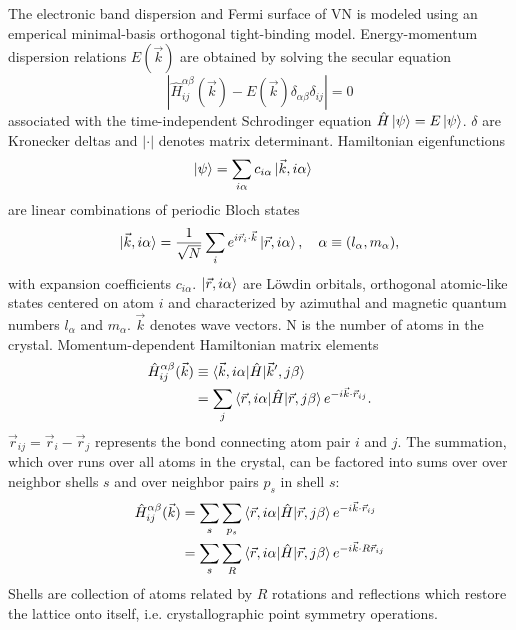 \documentclass[twocolumn,showpacs,preprintnumbers,superscriptaddress,prb,floatfix,aps,10pt]{revtex4-1}
\newcommand*{\ham}{\hat{H}}
\newcommand*{\bloch}{\ket{\vec{k}, i\alpha}}
\newcommand*{\lowdin}{\ket{\vec{r}, i\alpha}}
\newcommand*{\bondvec}{\vec{r}_{ij}}
\begin{document}
The electronic band dispersion and Fermi surface of VN is modeled using an emperical minimal-basis orthogonal tight-binding model. Energy-momentum dispersion relations $E(\vec{k})$ are obtained by solving the secular equation
\begin{equation}
\label{eq:secular}
\left| \ham^{\alpha\beta}_{ij}(\vec{k}) - E(\vec{k})\delta_{\alpha\beta}\delta_{ij} \right| = 0
\end{equation}
%
associated with the time-independent Schrodinger equation $\hat{H} \ket{\psi} = E \ket{\psi}$. $\delta$ are Kronecker deltas and $|\cdot |$ denotes matrix determinant. Hamiltonian eigenfunctions
\begin{align}
\ket{\psi}  &= \sum_{i\alpha} c_{i\alpha} \bloch
\end{align}
%
are linear combinations of periodic Bloch states 
\begin{equation}
\label{eq:bloch}
\bloch = \frac{1}{\sqrt{N}} \sum_i e^{i\vec{r}_i\cdot\vec{k}} \lowdin, 
\quad
\alpha \equiv (l_\alpha,m_\alpha),
\end{equation}
%
with expansion coefficients $c_{i\alpha}$. $\lowdin$ are L\"{o}wdin orbitals, orthogonal atomic-like states centered on atom $i$ and characterized by azimuthal and magnetic quantum numbers $l_\alpha$ and $m_\alpha$. $\vec{k}$ denotes wave vectors. N is the number of atoms in the crystal. Momentum-dependent Hamiltonian matrix elements
\begin{align}
\label{eq:matrix_element}
\ham^{\alpha\beta}_{ij}(\vec{k}) &\equiv \braket{\vec{k},i\alpha | \ham | \vec{k}',j\beta} \\
&= \sum_j \braket{\vec{r},i\alpha | \ham | \vec{r},j\beta} e^{-i \vec{k}\cdot\vec{r}_{ij}} .
\end{align}
%
$\bondvec = \vec{r}_i - \vec{r}_j$ represents the bond connecting atom pair $i$ and $j$. The summation, which over runs over all atoms in the crystal, can be factored into sums over over neighbor shells $s$ and over neighbor pairs $p_s$ in shell $s$:
%
\begin{align}
\label{eq:matrix_element_shell}
\ham^{\alpha\beta}_{ij}(\vec{k}) 
&= \sum_s \sum_{p_s} \braket{\vec{r},i\alpha | \ham | \vec{r},j\beta} e^{-i \vec{k} \cdot  \vec{r}_{ij} } \\
&= \sum_s \sum_{R} \braket{\vec{r},i\alpha | \ham | \vec{r},j\beta} e^{-i \vec{k} \cdot R\vec{r}_{ij} }
\end{align}
%
Shells are collection of atoms related by $R$ rotations and reflections which restore the lattice onto itself, i.e. crystallographic point symmetry operations.
\end{document}

